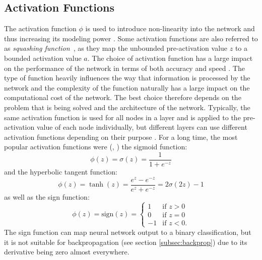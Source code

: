 \subsection{Activation Functions}
\label{subsec:activation-functions}
The activation function $\phi$ is used to introduce non-linearity into the network and thus increasing its modeling power \cite[section 1.2.1.3]{aggarwal_neural_2018}.
Some activation functions are also referred to as \textit{squashing function}~\cite[10]{haykin_neural_1998}, as they map the unbounded pre-activation value $z$ to a bounded activation value $a$.
The choice of activation function has a large impact on the performance of the network in terms of both accuracy and speed \cite{dubey_activation_2022}.
The type of function heavily influences the way that information is processed by the network and the complexity of the function naturally has a large impact on the computational cost of the network.
The best choice therefore depends on the problem that is being solved and the architecture of the network.
Typically, the same activation function is used for all nodes in a layer and is applied to the pre-activation value of each node individually, but different layers can use different activation functions depending on their purpose \cite[174]{goodfellow_deep_2016}.
For a long time, the most popular activation functions were (\cite[chapter 6.3]{goodfellow_deep_2016}, \cite[section 1.2.1.3]{aggarwal_neural_2018}) the sigmoid function:
\begin{equation}
    \phi(z) = \sigma(z) = \frac{1}{1+e^{-z}}
    \label{eq:sigmoid}
\end{equation}
and the hyperbolic tangent function:
\begin{equation}
    \phi(z) = \tanh(z) = \frac{e^z - e^{-z}}{e^z + e^{-z}} = 2\sigma(2z) - 1
    \label{eq:tanh}
\end{equation}
as well as the sign function:
\begin{equation}
    \phi(z) = \text{sign}(z) = \begin{cases}
        1 & \text{if } z > 0 \\
        0 & \text{if } z = 0 \\
        -1 & \text{if } z < 0 \text{.}
    \end{cases}
    \label{eq:sign}
\end{equation}
The sign function can map neural network output to a binary classification, but it is not suitable for backpropagation (see section \ref{subsec:backprop}) due to its derivative being zero almost everywhere.
